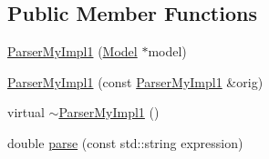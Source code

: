 \subsection*{Public Member Functions}
\begin{DoxyCompactItemize}
\item 
\hyperlink{class_parser_my_impl1_a09612c2d483378a394d98b79b2d286d9}{Parser\-My\-Impl1} (\hyperlink{class_model}{Model} $\ast$model)
\item 
\hyperlink{class_parser_my_impl1_ad59c32deaf5b413ce531d76dccd748d4}{Parser\-My\-Impl1} (const \hyperlink{class_parser_my_impl1}{Parser\-My\-Impl1} \&orig)
\item 
virtual \hyperlink{class_parser_my_impl1_a66c1b7f8305dc7d7f0f5000f771e9b99}{$\sim$\-Parser\-My\-Impl1} ()
\item 
double \hyperlink{class_parser_my_impl1_aacc6dcad2235633f216088cb78a10554}{parse} (const std\-::string expression)
\end{DoxyCompactItemize}


